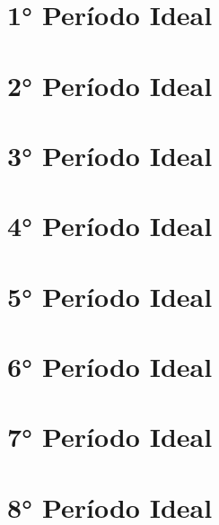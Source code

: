 \documentclass[a4paper, notoc]{tufte-book}
\begin{document}
\mainmatter


\part{1° Período Ideal}



\part{2° Período Ideal}







\part{3° Período Ideal}



\part{4° Período Ideal}

\part{5° Período Ideal}

\part{6° Período Ideal}

\part{7° Período Ideal}

\part{8° Período Ideal}
\end{document}
